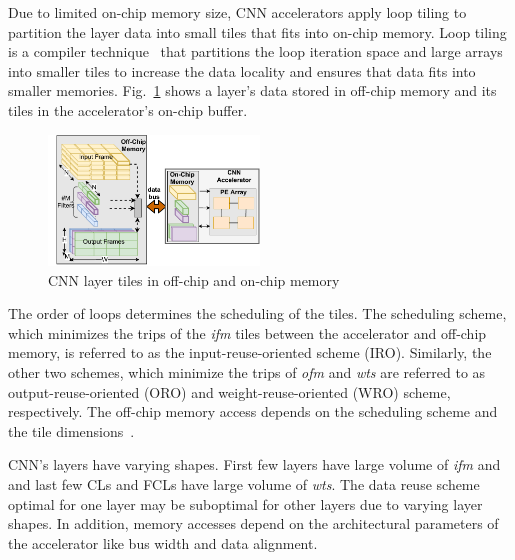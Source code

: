 \documentclass[a4paper,10pt]{article}
\begin{document}
Due to limited on-chip memory size, CNN accelerators apply loop tiling to partition the layer data into small tiles that fits into on-chip memory. Loop tiling is a compiler  technique~\cite{aho2006compilers} that partitions the loop iteration space and large arrays into smaller tiles to increase the data locality and ensures that data fits into smaller memories. 
Fig.~\ref{fig:partitioningDataUsingTiling} shows a layer's data stored in off-chip memory and its tiles in the accelerator's on-chip buffer.
\begin{figure}[!htb]
	\centering
	\includegraphics[width=0.5\textwidth]{images/AboutTheCNNTiles.pdf}
	\caption{CNN layer tiles in off-chip and on-chip memory}
	\label{fig:partitioningDataUsingTiling}
	\vspace{-1.0em}
\end{figure}
 The order of loops determines the scheduling of the tiles. The scheduling scheme, which minimizes the trips of the \textit{ifm} tiles between the accelerator and off-chip memory, is referred to as the input-reuse-oriented scheme (IRO). Similarly, the other two schemes, which minimize the trips of \textit{ofm} and \textit{wts} are referred to as output-reuse-oriented (ORO) and weight-reuse-oriented (WRO) scheme, respectively. The off-chip memory access depends on the scheduling scheme and the tile dimensions~\cite{zhang2015optimizing, Li2018SmartShuttleOO}. 
   
CNN's layers have varying shapes. First few layers have large volume of \textit{ifm} and  and last few CLs and FCLs have large volume of \textit{wts}. The data reuse scheme optimal for one layer may be suboptimal for other layers due to varying layer shapes. In addition, memory accesses depend on the architectural parameters of the accelerator like bus width and data alignment. 
\end{document}
